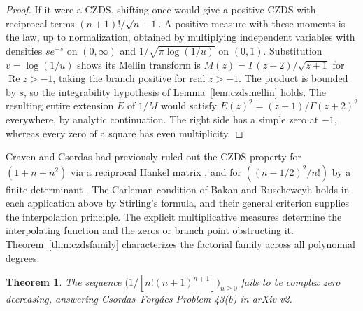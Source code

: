 \documentclass[11pt,a4paper]{article}
\newtheorem{theorem}{Theorem}[section]
\begin{document}
\begin{proof}
If it were a CZDS, shifting once would give a positive CZDS with
reciprocal terms $(n+1)!/\sqrt{n+1}$. A positive measure with these
moments is the law, up to normalization, obtained by multiplying
independent variables with densities $s e^{-s}$ on $(0,\infty)$ and
$1/\sqrt{\pi\log(1/u)}$ on $(0,1)$. Substitution $v=\log(1/u)$
shows its Mellin transform is $M(z)=\Gamma(z+2)/\sqrt{z+1}$
for $\operatorname{Re}z>-1$, taking the branch positive for real $z>-1$.
The product is bounded by $s$, so the integrability hypothesis of
Lemma~\ref{lem:czdsmellin} holds. The resulting entire extension $E$ of
$1/M$ would satisfy $E(z)^2=(z+1)/\Gamma(z+2)^2$ everywhere, by
analytic continuation. The right side has a simple zero at $-1$,
whereas every zero of a square has even multiplicity.
\end{proof}

Craven and Csordas had previously ruled out the CZDS property for
$(1+n+n^2)$ via a reciprocal Hankel matrix
\cite[Example 4.5]{CCsurveyZero}, and for $((n-1/2)^2/n!)$ by a finite
determinant \cite[Theorem 3.3]{CCserdica1996}. The Carleman condition of Bakan and Ruscheweyh holds in each application
above by Stirling's formula, and their general criterion supplies the
interpolation principle. The explicit multiplicative measures determine
the interpolating function and the zeros or branch point obstructing it.
Theorem~\ref{thm:czdsfamily} characterizes the factorial family across
all polynomial degrees.

\begin{theorem}\label{thm:czdstree}
The sequence $\bigl(1/[n!(n+1)^{n+1}]\bigr)_{n\ge0}$ fails to be
complex zero decreasing, answering Csordas--Forg\'acs Problem 43(b)
in arXiv v2.
\end{theorem}
\end{document}
